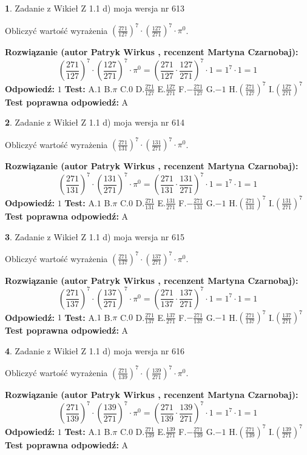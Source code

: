 \documentclass[12pt, a4paper]{article}
\theoremstyle{definition} %
\newtheorem{zad}{}
\newcommand{\zadStart}[1]{\begin{zad}#1\newline}
\newcommand{\zadStop}{\end{zad}}
\newcommand{\rozwStart}[2]{\noindent \textbf{Rozwiązanie (autor #1 , recenzent #2): }\newline}
\newcommand{\rozwStop}{\newline}
\newcommand{\odpStart}{\noindent \textbf{Odpowiedź:}\newline}
\newcommand{\odpStop}{\newline}
\newcommand{\testStart}{\noindent \textbf{Test:}\newline}
\newcommand{\testStop}{\newline}
\newcommand{\kluczStart}{\noindent \textbf{Test poprawna odpowiedź:}\newline}
\newcommand{\kluczStop}{\newline}
\begin{document}
\zadStart{Zadanie z Wikieł Z 1.1 d) moja wersja nr 613}

Obliczyć wartość wyrażenia $(\frac{271}{127})^{7} \cdot (\frac{127}{271})^{7} \cdot \pi^{0}$.
\zadStop
\rozwStart{Patryk Wirkus}{Martyna Czarnobaj}
$$(\frac{271}{127})^{7} \cdot (\frac{127}{271})^{7} \cdot \pi^{0} = (\frac{271}{127} \cdot \frac{127}{271})^{7} \cdot 1 = 1^{7} \cdot 1 = 1$$
\rozwStop
\odpStart
$1$
\odpStop
\testStart
A.$1$ B.$\pi$ C.$0$ D.$\frac{271}{127}$ E.$\frac{127}{271}$
F.$-\frac{271}{127}$ G.$-1$
H.$(\frac{271}{127})^{7}$
I.$(\frac{127}{271})^{7}$
\testStop
\kluczStart
A
\kluczStop



\zadStart{Zadanie z Wikieł Z 1.1 d) moja wersja nr 614}

Obliczyć wartość wyrażenia $(\frac{271}{131})^{7} \cdot (\frac{131}{271})^{7} \cdot \pi^{0}$.
\zadStop
\rozwStart{Patryk Wirkus}{Martyna Czarnobaj}
$$(\frac{271}{131})^{7} \cdot (\frac{131}{271})^{7} \cdot \pi^{0} = (\frac{271}{131} \cdot \frac{131}{271})^{7} \cdot 1 = 1^{7} \cdot 1 = 1$$
\rozwStop
\odpStart
$1$
\odpStop
\testStart
A.$1$ B.$\pi$ C.$0$ D.$\frac{271}{131}$ E.$\frac{131}{271}$
F.$-\frac{271}{131}$ G.$-1$
H.$(\frac{271}{131})^{7}$
I.$(\frac{131}{271})^{7}$
\testStop
\kluczStart
A
\kluczStop



\zadStart{Zadanie z Wikieł Z 1.1 d) moja wersja nr 615}

Obliczyć wartość wyrażenia $(\frac{271}{137})^{7} \cdot (\frac{137}{271})^{7} \cdot \pi^{0}$.
\zadStop
\rozwStart{Patryk Wirkus}{Martyna Czarnobaj}
$$(\frac{271}{137})^{7} \cdot (\frac{137}{271})^{7} \cdot \pi^{0} = (\frac{271}{137} \cdot \frac{137}{271})^{7} \cdot 1 = 1^{7} \cdot 1 = 1$$
\rozwStop
\odpStart
$1$
\odpStop
\testStart
A.$1$ B.$\pi$ C.$0$ D.$\frac{271}{137}$ E.$\frac{137}{271}$
F.$-\frac{271}{137}$ G.$-1$
H.$(\frac{271}{137})^{7}$
I.$(\frac{137}{271})^{7}$
\testStop
\kluczStart
A
\kluczStop



\zadStart{Zadanie z Wikieł Z 1.1 d) moja wersja nr 616}

Obliczyć wartość wyrażenia $(\frac{271}{139})^{7} \cdot (\frac{139}{271})^{7} \cdot \pi^{0}$.
\zadStop
\rozwStart{Patryk Wirkus}{Martyna Czarnobaj}
$$(\frac{271}{139})^{7} \cdot (\frac{139}{271})^{7} \cdot \pi^{0} = (\frac{271}{139} \cdot \frac{139}{271})^{7} \cdot 1 = 1^{7} \cdot 1 = 1$$
\rozwStop
\odpStart
$1$
\odpStop
\testStart
A.$1$ B.$\pi$ C.$0$ D.$\frac{271}{139}$ E.$\frac{139}{271}$
F.$-\frac{271}{139}$ G.$-1$
H.$(\frac{271}{139})^{7}$
I.$(\frac{139}{271})^{7}$
\testStop
\kluczStart
A
\kluczStop
\end{document}
